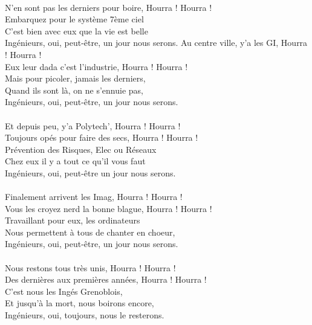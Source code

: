 \\N'en sont pas les derniers pour boire, Hourra ! Hourra !
\\Embarquez pour le système 7ème ciel
\\C'est bien avec eux que la vie est belle
\\Ingénieurs, oui, peut-être, un jour nous serons.
\breakpage
Au centre ville, y'a les GI, Hourra ! Hourra !
\\Eux leur dada c'est l'industrie, Hourra ! Hourra !
\\Mais pour picoler, jamais les derniers,
\\Quand ils sont là, on ne s'ennuie pas,
\\Ingénieurs, oui, peut-être, un jour nous serons.
\\\\Et depuis peu, y'a Polytech', Hourra ! Hourra !
\\Toujours opés pour faire des secs, Hourra ! Hourra !
\\Prévention des Risques, Elec ou Réseaux
\\Chez eux il y a tout ce qu'il vous faut
\\Ingénieurs, oui, peut-être un jour nous serons.
\\\\Finalement arrivent les Imag, Hourra ! Hourra !
\\Vous les croyez nerd la bonne blague, Hourra ! Hourra !
\\Travaillant pour eux, les ordinateurs
\\Nous permettent à tous de chanter en choeur,
\\Ingénieurs, oui, peut-être, un jour nous serons.
\\\\Nous restons tous très unis, Hourra ! Hourra !
\\Des dernières aux premières années, Hourra ! Hourra !
\\C'est nous les Ingés Grenoblois,
\\Et jusqu'à la mort, nous boirons encore,
\\Ingénieurs, oui, toujours, nous le resterons.

\breakpage

